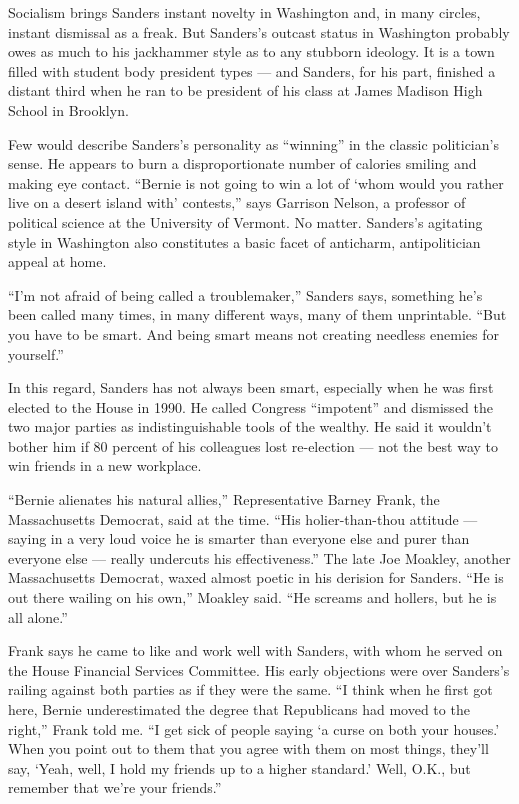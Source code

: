 Socialism brings Sanders instant novelty in Washington and, in many
circles, instant dismissal as a freak. But Sanders's outcast status in
Washington probably owes as much to his jackhammer style as to any
stubborn ideology. It is a town filled with student body president types
--- and Sanders, for his part, finished a distant third when he ran to
be president of his class at James Madison High School in Brooklyn.

Few would describe Sanders's personality as ``winning'' in the classic
politician's sense. He appears to burn a disproportionate number of
calories smiling and making eye contact. ``Bernie is not going to win a
lot of `whom would you rather live on a desert island with' contests,''
says Garrison Nelson, a professor of political science at the University
of Vermont. No matter. Sanders's agitating style in Washington also
constitutes a basic facet of anticharm, antipolitician appeal at home.

``I'm not afraid of being called a troublemaker,'' Sanders says,
something he's been called many times, in many different ways, many of
them unprintable. ``But you have to be smart. And being smart means not
creating needless enemies for yourself.''

In this regard, Sanders has not always been smart, especially when he
was first elected to the House in 1990. He called Congress ``impotent''
and dismissed the two major parties as indistinguishable tools of the
wealthy. He said it wouldn't bother him if 80 percent of his colleagues
lost re-election --- not the best way to win friends in a new workplace.

``Bernie alienates his natural allies,'' Representative Barney Frank,
the Massachusetts Democrat, said at the time. ``His holier-than-thou
attitude --- saying in a very loud voice he is smarter than everyone
else and purer than everyone else --- really undercuts his
effectiveness.'' The late Joe Moakley, another Massachusetts Democrat,
waxed almost poetic in his derision for Sanders. ``He is out there
wailing on his own,'' Moakley said. ``He screams and hollers, but he is
all alone.''

Frank says he came to like and work well with Sanders, with whom he
served on the House Financial Services Committee. His early objections
were over Sanders's railing against both parties as if they were the
same. ``I think when he first got here, Bernie underestimated the degree
that Republicans had moved to the right,'' Frank told me. ``I get sick
of people saying `a curse on both your houses.' When you point out to
them that you agree with them on most things, they'll say, `Yeah, well,
I hold my friends up to a higher standard.' Well, O.K., but remember
that we're your friends.''

